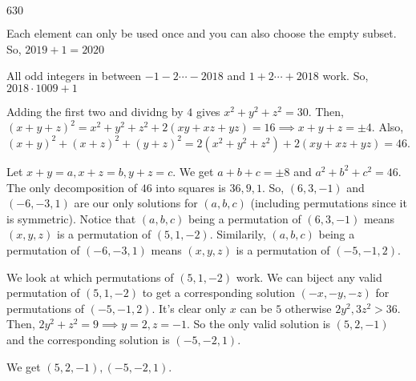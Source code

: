 \documentclass[11pt]{article}
\begin{document}
\begin{sol}
$\boxed{630}$
\end{sol}


\begin{sol}
Each element can only be used once and you can also choose the empty subset. So, $2019+1=\boxed{2020}$
\end{sol}


\begin{sol}
All odd integers in between $-1-2\cdots - 2018$ and $1+2\cdots + 2018$ work. So, $\boxed{2018\cdot 1009+1}$
\end{sol}

\begin{sol} 
Adding the first two and dividng by $4$ gives $x^2+y^2+z^2=30$. Then, $(x+y+z)^2=x^2+y^2+z^2+2(xy+xz+yz)=16\implies x+y+z=\pm 4$. Also, $(x+y)^2+(x+z)^2+(y+z)^2=2(x^2+y^2+z^2)+2(xy+xz+yz)=46$. 

Let $x+y=a, x+z=b, y+z=c$. We get $a+b+c=\pm 8$ and $a^2+b^2+c^2=46$. The only decomposition of $46$ into squares is $36,9,1$. So, $(6,3,-1)$ and $(-6,-3,1)$ are our only solutions for $(a,b,c)$ (including permutations since it is symmetric). Notice that $(a,b,c)$ being a permutation of $(6,3,-1)$ means $(x,y,z)$ is a permutation of $(5,1,-2)$. Similarily, $(a,b,c)$ being a permutation of $(-6,-3,1)$ means $(x,y,z)$ is a permutation of $(-5,-1,2)$.

We look at which permutations of $(5,1,-2)$ work. We can biject any valid permutation of $(5,1,-2)$ to get a corresponding solution $(-x,-y,-z)$ for permutations of $(-5,-1,2)$. It's clear only $x$ can be $5$ otherwise $2y^2,3z^2>36$. Then, $2y^2+z^2=9\implies y=2,z=-1$. So the only valid solution is $(5,2,-1)$ and the corresponding solution is $(-5,-2,1)$.

We get $\boxed{(5,2,-1),(-5,-2,1)}$.
\end{sol}

\end{document}
